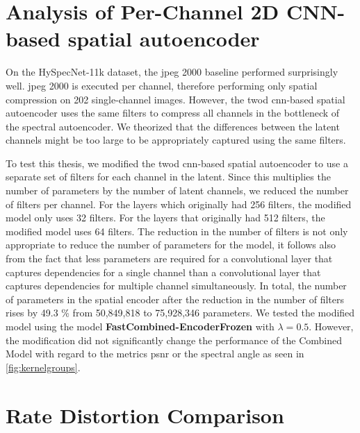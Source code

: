 \section{Analysis of Per-Channel 2D CNN-based spatial autoencoder}
On the HySpecNet-11k dataset, the \ac{jpeg} 2000 baseline performed surprisingly well. \Ac{jpeg} 2000 is executed per channel, therefore performing only spatial compression on 202 single-channel images. However, the \ac{twod} \ac{cnn}-based spatial autoencoder uses the same filters to compress all channels in the bottleneck of the spectral autoencoder. We theorized that the differences between the latent channels might be too large to be appropriately captured using the same filters. 

To test this thesis, we modified the \ac{twod} \ac{cnn}-based spatial autoencoder to use a separate set of filters for each channel in the latent. Since this multiplies the number of parameters by the number of latent channels, we reduced the number of filters per channel. For the layers which originally had 256 filters, the modified model only uses 32 filters. For the layers that originally had 512 filters, the modified model uses 64 filters. The reduction in the number of filters is not only appropriate to reduce the number of parameters for the model, it follows also from the fact that less parameters are required for a convolutional layer that captures dependencies for a single channel than a convolutional layer that captures dependencies for multiple channel simultaneously. In total, the number of parameters in the spatial encoder after the reduction in the number of filters rises by 49.3 \% from 50,849,818 to 75,928,346 parameters. We tested the modified model using the model \textbf{FastCombined-EncoderFrozen} with $\lambda=0.5$. However, the modification did not significantly change the performance of the Combined Model with regard to the metrics \ac{psnr} or the spectral angle as seen in \autoref{fig:kernelgroups}. 

\section{Rate Distortion Comparison\label{sec:ch5heur}}

